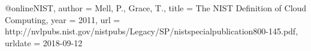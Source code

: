 \begin{thebibliography}
@online{NIST,
  author = {Mell, P., Grace, T.},
  title = {The NIST Definition of Cloud Computing},
  year = 2011,
  url = {http://nvlpubs.nist.gov/nistpubs/Legacy/SP/nistspecialpublication800-145.pdf},
  urldate = {2018-09-12}
}
\end{thebibliography}